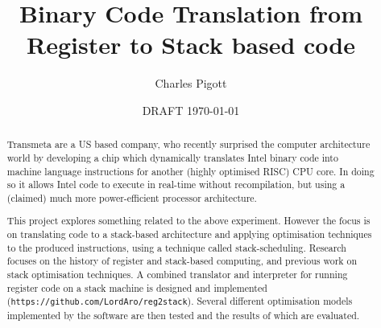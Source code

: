 \documentclass[11pt,a4paper,notitlepage]{report}
\title{Binary Code Translation from Register to Stack based code}
\author{Charles Pigott}
\date{DRAFT \today}
\begin{document}
\maketitle

\begin{abstract}
  Transmeta are a US based company, who recently surprised the computer
  architecture world by developing a chip which dynamically translates Intel
  binary code into machine language instructions for another (highly optimised
  RISC) CPU core. In doing so it allows Intel code to execute in real-time
  without recompilation, but using a (claimed) much more power-efficient
  processor architecture.

  This project explores something related to the above experiment. However the
  focus is on translating code to a stack-based architecture and applying
  optimisation techniques to the produced instructions, using a technique called
  stack-scheduling. Research focuses on the history of register and stack-based
  computing, and previous work on stack optimisation techniques. A combined
  translator and interpreter for running register code on a stack machine is
  designed and implemented (\texttt{https://github.com/LordAro/reg2stack}).
  Several different optimisation models implemented by the software are then
  tested and the results of which are evaluated.
\end{abstract}

\cleardoublepage%

\tableofcontents








\small\printbibliography%
\clearpage

\appendix

\end{document}

